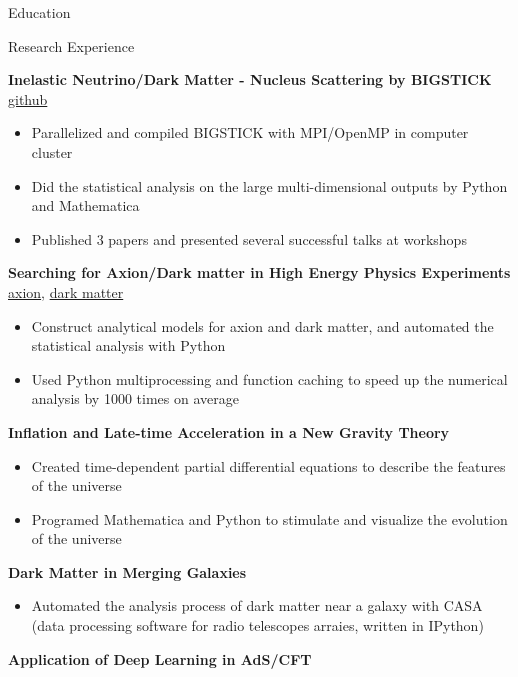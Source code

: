 \documentclass{resume}
\begin{document}
\begin{rSection}{Education}
\begin{rSection}{Research Experience}
\vspace{-1.25em}
\item \textbf{Inelastic Neutrino/Dark Matter - Nucleus Scattering by BIGSTICK} \hfill {\href{https://github.com/noctildon/Inelastic}{github}}
    \begin{itemize}
    \itemsep -3pt {}
    \item Parallelized and compiled BIGSTICK with MPI/OpenMP in computer cluster
    \item Did the statistical analysis on the large multi-dimensional outputs by Python and Mathematica
    \item Published 3 papers and presented several successful talks at workshops
    \end{itemize}
\item \textbf{Searching for Axion/Dark matter in High Energy Physics Experiments} \hfill {\href{https://github.com/noctildon/alplib}{axion}}, {\href{https://github.com/noctildon/lightDM}{dark matter}}
    \begin{itemize}
    \itemsep -3pt {}
    \item Construct analytical models for axion and dark matter, and automated the statistical analysis with Python
    \item Used Python multiprocessing and function caching to speed up the numerical analysis by 1000 times on average
    \end{itemize}
\item \textbf{Inflation and Late-time Acceleration in a New Gravity Theory}
    \begin{itemize}
    \itemsep -3pt {}
    \item Created time-dependent partial differential equations to describe the features of the universe
    \item Programed Mathematica and Python to stimulate and visualize the evolution of the universe
    \end{itemize}
\item \textbf{Dark Matter in Merging Galaxies}
    \begin{itemize}
    \itemsep -3pt {}
    \item Automated the analysis process of dark matter near a galaxy with CASA (data processing software for radio telescopes arraies, written in IPython)
    \end{itemize}
\item \textbf{Application of Deep Learning in AdS/CFT}
    \begin{itemize}

\end{itemize}
\end{rSection}
\end{rSection}
\end{document}
